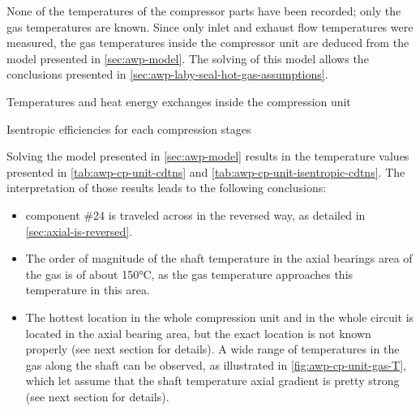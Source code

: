 None of the temperatures of the compressor parts have been recorded;
only the gas temperatures are known. Since only inlet and exhaust flow
temperatures were measured, the gas temperatures inside the
compressor unit are deduced from the model presented in
\cref{sec:awp-model}. The solving of this model allows the conclusions
presented in \cref{sec:awp-laby-seal-hot-gas-assumptions}.

\begin{table}
  \footnotesize
  \begin{center}
    
  \end{center}
  \caption{Temperatures and heat energy exchanges inside the compression unit}
  \label{tab:awp-cp-unit-cdtns}
\end{table}

\begin{table}
  \footnotesize
  \begin{center}
    \resizebox{\linewidth}{!}{
    }
  \end{center}
  \caption{Isentropic efficiencies for each compression stages}
  \label{tab:awp-cp-unit-isentropic-cdtns}
\end{table}

Solving the model presented in \cref{sec:awp-model} results in the
temperature values presented in \cref{tab:awp-cp-unit-cdtns} and
\cref{tab:awp-cp-unit-isentropic-cdtns}. The interpretation of those
results leads to the following conclusions:

\begin{itemize}
\item component \#24 is traveled across in the reversed way, as
  detailed in \cref{sec:axial-is-reversed}.
\item The order of magnitude of the shaft temperature in the axial
  bearings area of the gas is of about
  150\si{\degreeCelsius}, as the gas temperature approaches this temperature
  in this area.
\item The hottest location in the whole compression unit and in the
  whole circuit is located in the axial bearing area, but the exact
  location is not known properly (see next section for details). A
  wide range of temperatures in the gas along the shaft can be
  observed, as illustrated in \cref{fig:awp-cp-unit-gas-T}, which let
  assume that the shaft temperature axial gradient is pretty strong
  (see next section for details).
\end{itemize}

